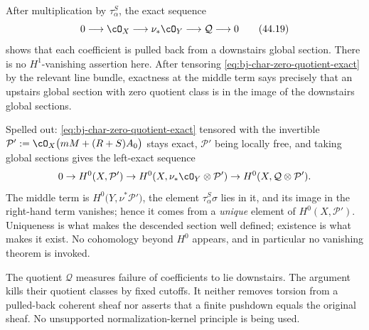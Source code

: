 After multiplication by $\tau_\alpha^S$, the exact sequence
\[
 0\longrightarrow\cO_X\longrightarrow\nu_*\cO_Y
       \longrightarrow\mathcal Q\longrightarrow0
\tag{44.19}\label{eq:bj-char-zero-quotient-exact}
\]
shows that each coefficient is pulled back from a downstairs global section.
There is no $H^1$-vanishing assertion here.
After tensoring \eqref{eq:bj-char-zero-quotient-exact} by the relevant line
bundle, exactness at the middle term says precisely that an upstairs global
section with zero quotient class is in the image of the downstairs global
sections.

Spelled out: \eqref{eq:bj-char-zero-quotient-exact} tensored with the
invertible $\mathcal P':=\cO_X\bigl(mM+(R+S)A_0\bigr)$ stays exact,
$\mathcal P'$ being locally free, and taking global sections gives the
left-exact sequence
\[
 0\to H^0(X,\mathcal P')\to H^0(X,\nu_*\cO_Y\otimes\mathcal P')
   \to H^0(X,\mathcal Q\otimes\mathcal P').
\]
The middle term is $H^0\bigl(Y,\nu^*\mathcal P'\bigr)$, the element
$\tau_\alpha^S\sigma$ lies in it, and its image in the right-hand term
vanishes; hence it comes from a \emph{unique} element of
$H^0(X,\mathcal P')$.  Uniqueness is what makes the descended section
well defined; existence is what makes it exist.  No cohomology beyond
$H^0$ appears, and in particular no vanishing theorem is invoked.

\begin{remark}
\label{rem:ch44-not-torsion-kernel}
The quotient $\mathcal Q$ measures failure of coefficients to lie
downstairs.
The argument kills their quotient classes by fixed cutoffs.
It neither removes torsion from a pulled-back coherent sheaf nor asserts that
a finite pushdown equals the original sheaf.
No unsupported normalization-kernel principle is being used.
\end{remark}

